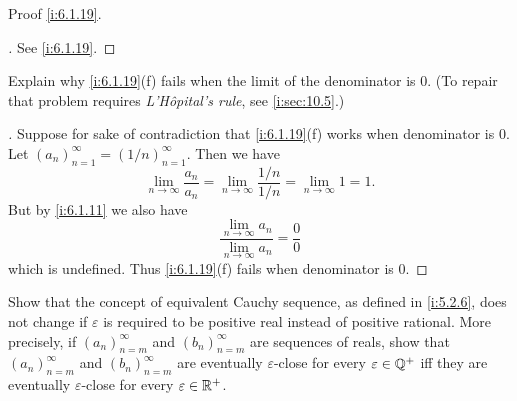 \begin{ex}\label{i:ex:6.1.8}
  Proof \cref{i:6.1.19}.
\end{ex}

\begin{proof}[]
  See \cref{i:6.1.19}.
\end{proof}

\begin{ex}\label{i:ex:6.1.9}
  Explain why \cref{i:6.1.19}(f) fails when the limit of the denominator is \(0\).
  (To repair that problem requires \emph{L'Hôpital's rule}, see \cref{i:sec:10.5}.)
\end{ex}

\begin{proof}[]
  Suppose for sake of contradiction that \cref{i:6.1.19}(f) works when denominator is \(0\).
  Let \((a_n)_{n = 1}^\infty = (1 / n)_{n = 1}^\infty\).
  Then we have
  \[
    \lim_{n \to \infty} \dfrac{a_n}{a_n} = \lim_{n \to \infty} \dfrac{1 / n}{1 / n} = \lim_{n \to \infty} 1 = 1.
  \]
  But by \cref{i:6.1.11} we also have
  \[
    \dfrac{\lim_{n \to \infty} a_n}{\lim_{n \to \infty} a_n} = \dfrac{0}{0}
  \]
  which is undefined.
  Thus \cref{i:6.1.19}(f) fails when denominator is \(0\).
\end{proof}

\begin{ex}\label{i:ex:6.1.10}
  Show that the concept of equivalent Cauchy sequence, as defined in \cref{i:5.2.6}, does not change if \(\varepsilon\) is required to be positive real instead of positive rational.
  More precisely, if \((a_n)_{n = m}^\infty\) and \((b_n)_{n = m}^\infty\) are sequences of reals, show that \((a_n)_{n = m}^\infty\) and \((b_n)_{n = m}^\infty\) are eventually \(\varepsilon\)-close for every \(\varepsilon \in \mathbb{Q}^+\) iff they are eventually \(\varepsilon\)-close for every \(\varepsilon \in \mathbb{R}^+\).
\end{ex}

